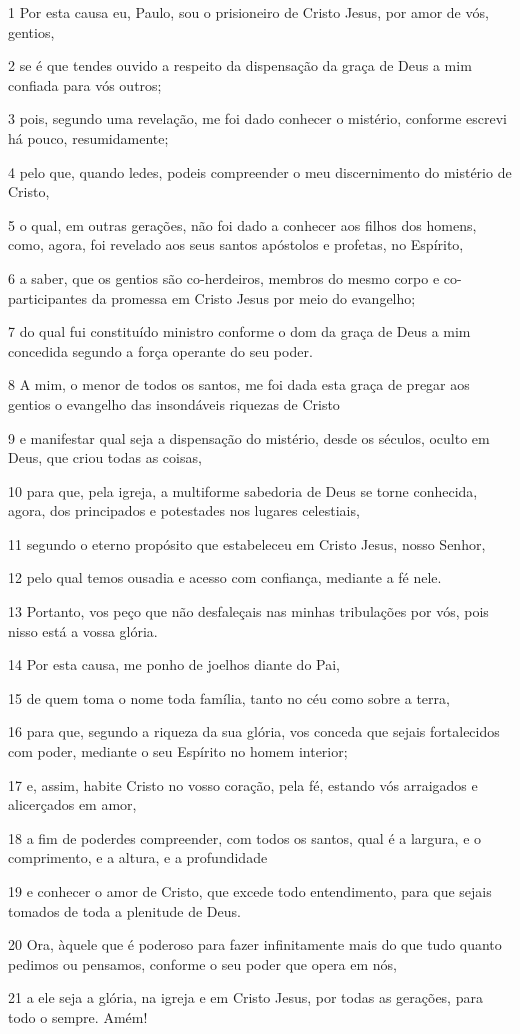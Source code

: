 \par 1 Por esta causa eu, Paulo, sou o prisioneiro de Cristo Jesus, por amor de vós, gentios,
\par 2 se é que tendes ouvido a respeito da dispensação da graça de Deus a mim confiada para vós outros;
\par 3 pois, segundo uma revelação, me foi dado conhecer o mistério, conforme escrevi há pouco, resumidamente;
\par 4 pelo que, quando ledes, podeis compreender o meu discernimento do mistério de Cristo,
\par 5 o qual, em outras gerações, não foi dado a conhecer aos filhos dos homens, como, agora, foi revelado aos seus santos apóstolos e profetas, no Espírito,
\par 6 a saber, que os gentios são co-herdeiros, membros do mesmo corpo e co-participantes da promessa em Cristo Jesus por meio do evangelho;
\par 7 do qual fui constituído ministro conforme o dom da graça de Deus a mim concedida segundo a força operante do seu poder.
\par 8 A mim, o menor de todos os santos, me foi dada esta graça de pregar aos gentios o evangelho das insondáveis riquezas de Cristo
\par 9 e manifestar qual seja a dispensação do mistério, desde os séculos, oculto em Deus, que criou todas as coisas,
\par 10 para que, pela igreja, a multiforme sabedoria de Deus se torne conhecida, agora, dos principados e potestades nos lugares celestiais,
\par 11 segundo o eterno propósito que estabeleceu em Cristo Jesus, nosso Senhor,
\par 12 pelo qual temos ousadia e acesso com confiança, mediante a fé nele.
\par 13 Portanto, vos peço que não desfaleçais nas minhas tribulações por vós, pois nisso está a vossa glória.
\par 14 Por esta causa, me ponho de joelhos diante do Pai,
\par 15 de quem toma o nome toda família, tanto no céu como sobre a terra,
\par 16 para que, segundo a riqueza da sua glória, vos conceda que sejais fortalecidos com poder, mediante o seu Espírito no homem interior;
\par 17 e, assim, habite Cristo no vosso coração, pela fé, estando vós arraigados e alicerçados em amor,
\par 18 a fim de poderdes compreender, com todos os santos, qual é a largura, e o comprimento, e a altura, e a profundidade
\par 19 e conhecer o amor de Cristo, que excede todo entendimento, para que sejais tomados de toda a plenitude de Deus.
\par 20 Ora, àquele que é poderoso para fazer infinitamente mais do que tudo quanto pedimos ou pensamos, conforme o seu poder que opera em nós,
\par 21 a ele seja a glória, na igreja e em Cristo Jesus, por todas as gerações, para todo o sempre. Amém!

